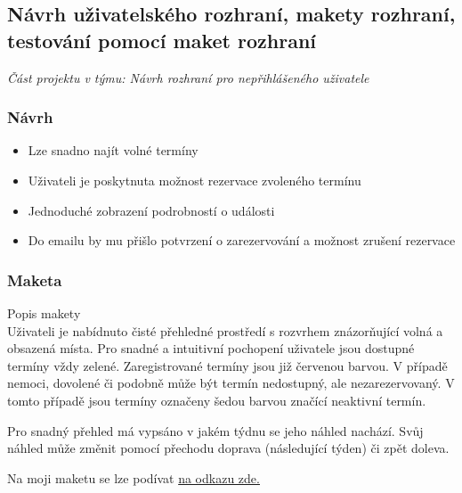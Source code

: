 \subsection{Návrh uživatelského rozhraní, makety rozhraní, testování pomocí maket rozhraní}

\emph{Část projektu v týmu: Návrh rozhraní pro nepřihlášeného uživatele}

\subsubsection*{Návrh}

\begin{itemize}
    \item Lze snadno najít volné termíny
    \item Uživateli je poskytnuta možnost rezervace zvoleného termínu
    \item Jednoduché zobrazení podrobností o události
    \item Do emailu by mu přišlo potvrzení o zarezervování a možnost zrušení rezervace
\end{itemize}

\subsubsection*{Maketa}

{\noindent\large Popis makety}\\
Uživateli je nabídnuto čisté přehledné prostředí s rozvrhem znázorňující volná a obsazená místa. Pro snadné a intuitivní pochopení uživatele jsou dostupné termíny vždy zelené. Zaregistrované termíny jsou již červenou barvou. V případě nemoci, dovolené či podobně může být termín nedostupný, ale nezarezervovaný. V tomto případě jsou termíny označeny šedou barvou značící neaktivní termín. 

Pro snadný přehled má vypsáno v jakém týdnu se jeho náhled nachází. Svůj náhled může změnit pomocí přechodu doprava (následující týden) či zpět doleva. 

Na moji maketu se lze podívat \href{https://www.figma.com/file/4nOyfGc52uArBuMkx1NhXb/Untitled}{na odkazu zde.}

